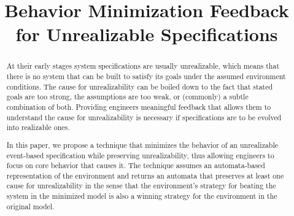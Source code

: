 \documentclass[sigconf,review,anonymous]{acmart}
\begin{document}

\title{Behavior Minimization Feedback for Unrealizable  
Specifications }


\author{
	\and
}
%




\begin{abstract}
At their early stages system specifications are usually unrealizable, which means that there is no system that can be built to satisfy its goals under
the assumed environment conditions. The cause for unrealizability can be
boiled down to the fact that stated goals are too strong, the assumptions are
too weak, or (commonly) a subtle combination of both.  Providing engineers meaningful
feedback that allows them to understand the cause for unrealizability is
necessary if specifications are to be evolved into realizable ones.

In this paper, we propose a technique that minimizes the behavior of an
unrealizable event-based \gr specification while preserving 
unrealizability, thus allowing
engineers to focus on core behavior that causes it. The technique assumes an automata-based representation of the environment
and returns an automata that preserves at least one cause for 
unrealizability in the sense 
that the environment's strategy for beating the system in 
the minimized model is also a 
winning strategy for the environment in the original model. 

\end{abstract}
\end{document}

